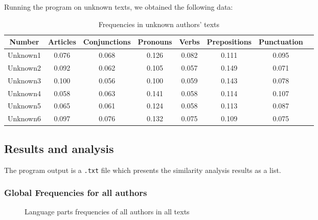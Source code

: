 \documentclass[a4paper,11pt, twoside]{article}
\begin{document}
		\noindent
		Running the program on unknown texts, we obtained the following data:
		\begin{table}[h!]
			\small
			\begin{tabular}{cccccccc}
				\toprule
				Number & Articles & Conjunctions & Pronouns & Verbs & Prepositions & Punctuation \\
				\midrule
				Unknown1 & 0.076 & 0.068 & 0.126 & 0.082 & 0.111 & 0.095 \\
				Unknown2 & 0.092 & 0.062 & 0.105 & 0.057 & 0.149 & 0.071 \\
				Unknown3 & 0.100 & 0.056 & 0.100 & 0.059 & 0.143 & 0.078 \\
				Unknown4 & 0.058 & 0.063 & 0.141 & 0.058 & 0.114 & 0.107 \\
				Unknown5 & 0.065 & 0.061 & 0.124 & 0.058 & 0.113 & 0.087 \\
				Unknown6 & 0.097 & 0.076 & 0.132 & 0.075 & 0.109 & 0.075 \\
				\bottomrule
			\end{tabular}
			\caption{Frequencies in unknown authors' texts}
			\label{tab:unknown-freq}
		\end{table}

	\newpage
	\subsection{Results and analysis}

	The program output is a \texttt{.txt} file which presents the similarity analysis results as a list. 

	\subsubsection{Global Frequencies for all authors}

	\begin{figure}[h!]
		\centering
		\caption{Language parts frequencies of all authors in all texts}
		\label{tikz:frequencies}
	\end{figure}
\end{document}
